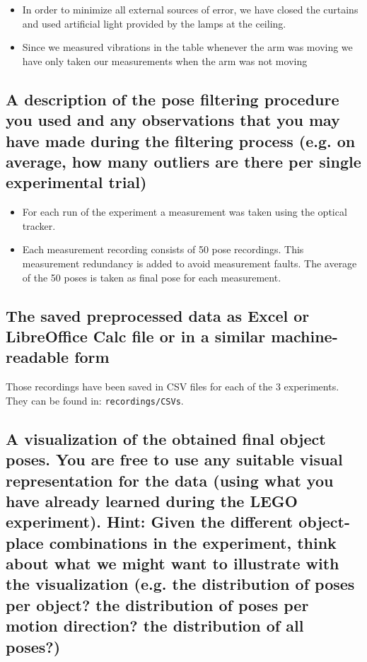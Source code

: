 \begin{itemize}
	\item In order to minimize all external sources of error, we have closed the curtains and used artificial light provided by the lamps at the ceiling.
	\item Since we measured vibrations in the table whenever the arm was moving we have only taken our measurements when the arm was not moving
\end{itemize}

\subsection{A description of the pose filtering procedure you used and any observations that you may have made during the filtering process (e.g. on average, how many outliers are there per single experimental trial)}

\begin{itemize}
	\item For each run of the experiment a measurement was taken using the optical tracker.
	\item Each measurement recording consists of 50 pose recordings. This measurement redundancy is added to avoid measurement faults. The average of the 50 poses is taken as final pose for each measurement.
	
\end{itemize}


\subsection{The saved preprocessed data as Excel or LibreOffice Calc file or in a similar machine-readable form}

Those recordings have been saved in CSV files for each of the 3 experiments. They can be found in: \texttt{recordings/CSVs}.

\subsection{A visualization of the obtained final object poses. You are free to use any suitable visual representation for the data (using what you have already learned during the LEGO experiment). Hint: Given the different object-place combinations in the experiment, think about what we might want to illustrate with the visualization (e.g. the distribution of poses per object? the distribution of poses per motion direction? the distribution of all poses?)}


